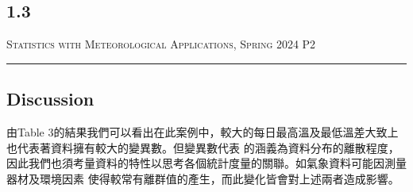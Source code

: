 \documentclass{article}
\begin{document}
\begin{CJK*}{UTF8}{bsmi}
\section*{1.3}
\renewcommand{\arraystretch}{1.5} 
    \begin{table}[htbp]
        \centering
            \caption{Mean DTR and variance.}
    \end{table}
    \renewcommand{\arraystretch}{1.0} 

    \newpage

\thispagestyle{empty}
\hfill {\scshape \large Statistics with Meteorological Applications, Spring 2024} \hfill {\scshape P2}
\smallskip
\hrule
\bigskip
\bigskip
\bigskip

\subsection*{Discussion}
\begin{spacing}{2}
    \begin{large}
        由Table 3的結果我們可以看出在此案例中，較大的每日最高溫及最低溫差大致上也代表著資料擁有較大的變異數。但變異數代表
        的涵義為資料分布的離散程度，因此我們也須考量資料的特性以思考各個統計度量的關聯。如氣象資料可能因測量器材及環境因素
        使得較常有離群值的產生，而此變化皆會對上述兩者造成影響。
    \end{large}
\end{spacing}




\end{CJK*}
\end{document}

